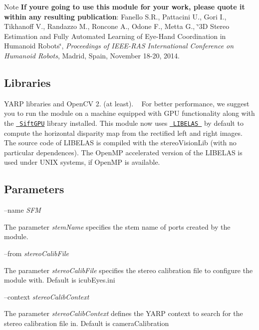 \begin{DoxyNote}{Note}
{\bfseries{If you\textquotesingle{}re going to use this module for your work, please quote it within any resulting publication}}\+: Fanello S.\+R., Pattacini U., Gori I., Tikhanoff V., Randazzo M., Roncone A., Odone F., Metta G., \char`\"{}3\+D Stereo Estimation and Fully Automated
      Learning of Eye-\/\+Hand Coordination in Humanoid Robots\char`\"{}, {\itshape Proceedings of I\+E\+E\+E-\/\+R\+AS International Conference on Humanoid Robots}, Madrid, Spain, November 18-\/20, 2014.
\end{DoxyNote}
\hypertarget{group__SFM_lib_sec}{}\subsection{Libraries}\label{group__SFM_lib_sec}
Y\+A\+RP libraries and Open\+CV 2. (at least). ~\newline
For better performance, we suggest you to run the module on a machine equipped with G\+PU functionality along with the \href{http://cs.unc.edu/~ccwu/siftgpu}{\texttt{ Sift\+G\+PU}} library installed. This module now uses \href{http://www.cvlibs.net/software/libelas/}{\texttt{ L\+I\+B\+E\+L\+AS }} by default to compute the horizontal disparity map from the rectified left and right images. The source code of L\+I\+B\+E\+L\+AS is compiled with the stereo\+Vision\+Lib (with no particular dependences). The Open\+MP accelerated version of the L\+I\+B\+E\+L\+AS is used under U\+N\+IX systems, if Open\+MP is available.\hypertarget{group__SFM_parameters_sec}{}\subsection{Parameters}\label{group__SFM_parameters_sec}
--name {\itshape S\+FM} 
\begin{DoxyItemize}
\item The parameter {\itshape stem\+Name} specifies the stem name of ports created by the module.
\end{DoxyItemize}

--from {\itshape stereo\+Calib\+File} 
\begin{DoxyItemize}
\item The parameter {\itshape stereo\+Calib\+File} specifies the stereo calibration file to configure the module with. Default is icub\+Eyes.\+ini
\end{DoxyItemize}

--context {\itshape stereo\+Calib\+Context} 
\begin{DoxyItemize}
\item The parameter {\itshape stereo\+Calib\+Context} defines the Y\+A\+RP context to search for the stereo calibration file in. Default is camera\+Calibration
\end{DoxyItemize}

